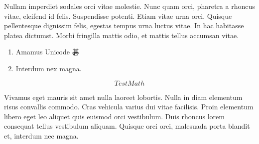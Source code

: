 Nullam imperdiet sodales orci vitae molestie. Nunc quam orci, pharetra a
rhoncus vitae, eleifend id felis. Suspendisse potenti. Etiam vitae urna orci.
Quisque pellentesque dignissim felis, egestas tempus urna luctus vitae. In hac
habitasse platea dictumst. Morbi fringilla mattis odio, et mattis tellus
accumsan vitae.

\begin{enumerate}
    \item{Amamus Unicode 碁}
    \item{Interdum nex magna.}
\end{enumerate}

\[Test Math\]

Vivamus eget mauris sit amet nulla laoreet lobortis. Nulla in diam elementum
risus convallis commodo. Cras vehicula varius dui vitae facilisis. Proin
elementum libero eget leo aliquet quis euismod orci vestibulum. Duis rhoncus
lorem consequat tellus vestibulum aliquam. Quisque orci orci, malesuada porta
blandit et, interdum nec magna.
